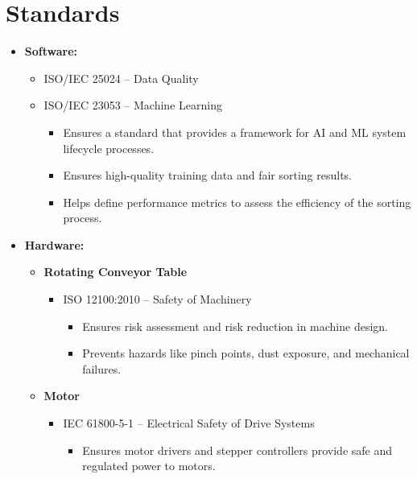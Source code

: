
\section{Standards}

\begin{itemize}
    \item \textbf{Software:}
    \begin{itemize}
        \item ISO/IEC 25024 – Data Quality
        \item ISO/IEC 23053 – Machine Learning
        \begin{itemize}
            \item Ensures a standard that provides a framework for AI and ML system lifecycle processes.
            \item Ensures high-quality training data and fair sorting results.
            \item Helps define performance metrics to assess the efficiency of the sorting process.
        \end{itemize}
    \end{itemize}
    
    \item \textbf{Hardware:}
    \begin{itemize}
        \item \textbf{Rotating Conveyor Table}
        \begin{itemize}
            \item ISO 12100:2010 – Safety of Machinery
            \begin{itemize}
                \item Ensures risk assessment and risk reduction in machine design.
                \item Prevents hazards like pinch points, dust exposure, and mechanical failures.
            \end{itemize}
        \end{itemize}
        
        \item \textbf{Motor}
        \begin{itemize}
            \item IEC 61800-5-1 – Electrical Safety of Drive Systems
            \begin{itemize}
                \item Ensures motor drivers and stepper controllers provide safe and regulated power to motors.
            \end{itemize}
        \end{itemize}
        

\end{itemize}
\end{itemize}
